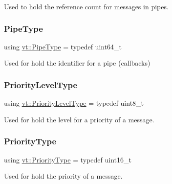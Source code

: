 Used to hold the reference count for messages in pipes. 

\mbox{\label{namespacevt_ac9852acda74d1896f48f406cd72c7bd3}} 
\subsubsection{\texorpdfstring{Pipe\+Type}{PipeType}}
{\footnotesize\ttfamily using \hyperlink{namespacevt_ac9852acda74d1896f48f406cd72c7bd3}{vt\+::\+Pipe\+Type} = typedef uint64\+\_\+t}



Used for hold the identifier for a pipe (callbacks) 

\mbox{\label{namespacevt_a53e07fdb3351b0f263e0dfd51b968d5e}} 
\subsubsection{\texorpdfstring{Priority\+Level\+Type}{PriorityLevelType}}
{\footnotesize\ttfamily using \hyperlink{namespacevt_a53e07fdb3351b0f263e0dfd51b968d5e}{vt\+::\+Priority\+Level\+Type} = typedef uint8\+\_\+t}



Used for hold the level for a priority of a message. 

\mbox{\label{namespacevt_a86bff9f556eb761b27fc8600d006ac04}} 
\subsubsection{\texorpdfstring{Priority\+Type}{PriorityType}}
{\footnotesize\ttfamily using \hyperlink{namespacevt_a86bff9f556eb761b27fc8600d006ac04}{vt\+::\+Priority\+Type} = typedef uint16\+\_\+t}



Used for hold the priority of a message. 

\mbox{\label{namespacevt_a97f320a1d3b9b4035e591671cd7d10f0}} 
